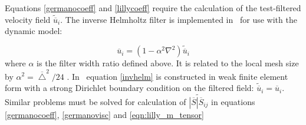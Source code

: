 Equations \eqref{germanocoeff} and \eqref{lillycoeff} require the calculation of the test-filtered velocity field $\tilde{\overline{u}}_i$. The inverse Helmholtz filter is implemented in \fluidity\ for use with the dynamic model:

\begin{equation}\label{invhelm}
\overline{u}_i = \left( 1 - \alpha^2 \nabla^2 \right) \tilde{\overline{u}}_i
\end{equation}
where $\alpha$ is the filter width ratio defined above. It is related to the local mesh size by $\alpha^2 = \overline \bigtriangleup^2/24$ \citep{pope2000}. In \fluidity\ equation \eqref{invhelm} is constructed in weak finite element form with a strong Dirichlet boundary condition on the filtered field: $\tilde{\overline{u}}_i = \overline{u}_i$. Similar problems must be solved for calculation of
$\widetilde{ | \overline S | \overline S_{ij}}$ in equations \eqref{germanocoeff}, \eqref{germanovisc} and \eqref{eqn:lilly_m_tensor} 

